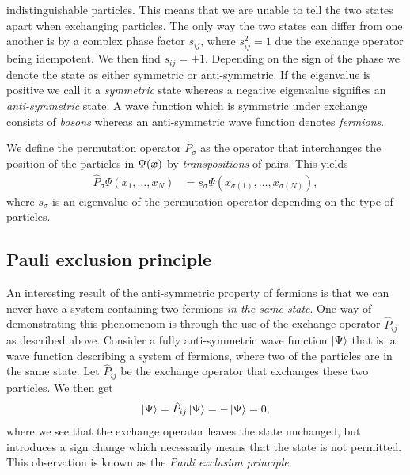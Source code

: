         indistinguishable particles.
        This means that we are unable to tell the two states apart when
        exchanging particles.
        The only way the two states can differ from one another is by a
        complex phase factor $s_{ij}$, where $s_{ij}^2 = 1$ due the exchange
        operator being idempotent.
        We then find $s_{ij} = \pm 1$.
        Depending on the sign of the phase we denote the state as either
        symmetric or anti-symmetric.
        If the eigenvalue is positive we call it a \emph{symmetric} state
        whereas a negative eigenvalue signifies an \emph{anti-symmetric}
        state.
        A wave function which is symmetric under exchange consists of
        \emph{bosons} whereas an anti-symmetric wave function denotes
        \emph{fermions}.


        We define the permutation operator $\hat{P}_{\sigma}$ as the
        operator that interchanges the position of the particles in
        $\Psi(\boldsymbol{x})$ by \emph{transpositions} of pairs.
        This yields
        \begin{align}
            \hat{P}_{\sigma}\Psi(x_1, \dots, x_N)
            &= s_{\sigma}\Psi(x_{\sigma(1)}, \dots, x_{\sigma(N)}),
        \end{align}
        where $s_{\sigma}$ is an eigenvalue of the permutation operator
        depending on the type of particles.

        \subsection{Pauli exclusion principle}
            An interesting result of the anti-symmetric property of
            fermions is that we can never have a system containing two
            fermions \emph{in the same state}.
            One way of demonstrating this phenomenom is through the use of
            the exchange operator $\hat{P}_{ij}$ as described above.
            Consider a fully anti-symmetric wave function $\ket{\Psi}$
            that is, a wave function describing a system of fermions, where
            two of the particles are in the same state.
            Let $\hat{P}_{ij}$ be the exchange operator that exchanges these
            two particles.
            We then get
            \begin{align}
                \ket{\Psi}
                =
                \hat{P}_{ij}\ket{\Psi}
                = -\ket{\Psi}
                = 0,
            \end{align}
            where we see that the exchange operator leaves the state
            unchanged, but introduces a sign change which necessarily means
            that the state is not permitted.
            This observation is known as the \emph{Pauli exclusion
            principle}.




